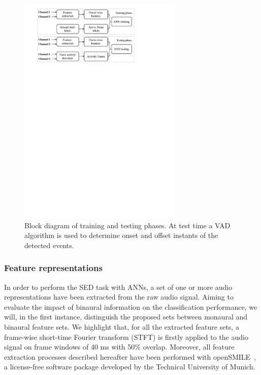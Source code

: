 \begin{figure}[h]
	\centering
	\includegraphics[width=0.7\textwidth]{img/system_scheme.pdf}
	\caption[Sound Event Detection - DCASE 2016]{Block diagram of training and testing phases. At test time a VAD algorithm is used to determine onset and offset instants of the detected events.}
	\label{fig:system_scheme}
\end{figure}

\subsubsection{Feature representations}

In order to perform the SED task with ANNs, a set of one or more audio representations have been extracted from the raw audio signal. Aiming to evaluate the impact of binaural information on the classification performance, we will, in the first instance, distinguish the proposed sets between monaural and binaural feature sets. We highlight that, for all the extracted feature sets, a frame-wise short-time Fourier transform (STFT) is firstly applied to the audio signal on frame windows of 40 ms with 50\% overlap. Moreover, all feature extraction processes described hereafter have been performed with openSMILE~\cite{eyben2013recent}, a license-free software package developed by the Technical University of Munich.

